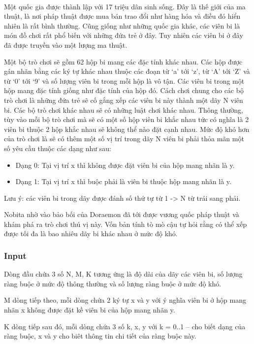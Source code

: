 

 

Một quốc gia được thành lập với 17 triệu dân sinh sống. Đây là thế giới của ma thuật, là nơi pháp thuật được mua bán trao đổi như hàng hóa và điều đó hiển nhiên là rất bình thường. Cũng giống như những quốc gia khác, các viên bi là món đồ chơi rất phổ biến với những đứa trẻ ở đây. Tuy nhiên các viên bi ở đây đã được truyền vào một lượng ma thuật.

Một bộ trò chơi sẽ gồm 62 hộp bi mang các đặc tính khác nhau. Các hộp được gán nhãn bằng các ký tự khác nhau thuộc các đoạn từ ‘a’ tới ‘z’, từ ‘A’ tới ‘Z’ và từ ‘0’ tới ‘9’ và số lượng viên bi trong mỗi hộp là vô tận. Các viên bi trong một hộp mang đặc tính giống như đặc tính của hộp đó. Cách chơi chung cho các bộ trò chơi là những đứa trẻ sẽ cố gắng xếp các viên bi này thành một dãy N viên bi. Các bộ trò chơi khác nhau sẽ có những luật chơi khác nhau. Thông thường, tùy vào mỗi bộ trò chơi mà sẽ có một số hộp viên bi khắc nhau tức có nghĩa là 2 viên bi thuộc 2 hộp khắc nhau sẽ không thể nào đặt cạnh nhau. Mức độ khó hơn của trò chơi là sẽ có thêm một số vị trí trong dãy N viên bi phải thỏa mãn một số yêu cầu thuộc các dạng như sau:
\begin{itemize}
	\item Dạng 0: Tại vị trí x thì không được đặt viên bi của hộp mang nhãn là y.
	\item Dạng 1: Tại vị trí x thì buộc phải là viên bi thuộc hộp mang nhãn là y.
\end{itemize}

Lưu ý: các viên bi trong dãy được đánh số thứ tự từ 1 -> N từ trái sang phải.

Nobita nhờ vào bảo bối của Doraemon đã tới được vương quốc pháp thuật và khám phá ra trò chơi thú vị này. Vốn bản tính tò mò cậu tự hỏi rằng có thể xếp được tối đa là bao nhiêu dãy bi khác nhau ở mức độ khó.

\subsubsection{\textbf{Input }}

Dòng đầu chứa 3 số N, M, K tương ứng là độ dài của dãy các viên bi, số lượng ràng buộc ở mức độ thông thường và số lượng ràng buộc ở mức độ khó.


M dòng tiếp theo, mỗi dòng chứa 2 ký tự x và y với ý nghĩa viên bi ở hộp mang nhãn x không được đặt kề viên bi của hộp mang nhãn y.


K dòng tiếp sau đó, mỗi dòng chứa 3 số k, x, y với k = 0..1 – cho biết dạng của ràng buộc, x và y cho biêt thông tin chi tiết của ràng buộc này.

